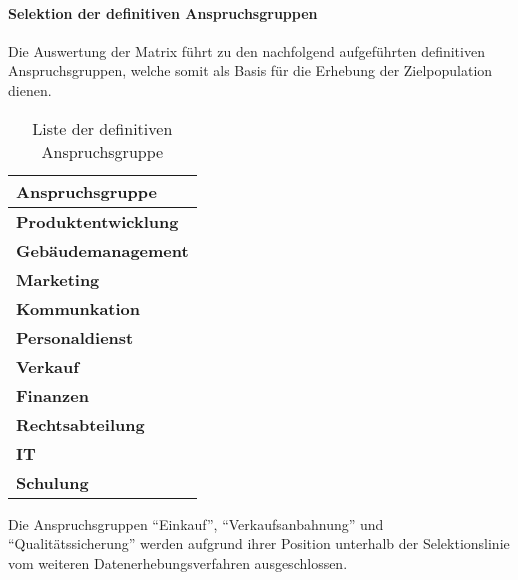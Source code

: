 \documentclass[../../main.tex]{subfiles}
\begin{document}

\paragraph*{Selektion der definitiven Anspruchsgruppen}\mbox{}

\begin{sloppypar}
Die Auswertung der Matrix führt zu den nachfolgend aufgeführten definitiven Anspruchsgruppen, welche somit als Basis für die Erhebung der Zielpopulation dienen.
\end{sloppypar}


\begin{table}[H]
\tablefontsize	
\caption{Liste der definitiven Anspruchsgruppe}
\label{definitive_anspruchsgruppen}


\begin{tabular}{ |p{8cm}| }


\hline
\tableheaderbgcolor
\textbf{Anspruchsgruppe} \\ 
\hline


\textbf{Produktentwicklung}             \\ \hline
\textbf{Gebäudemanagement}              \\ \hline
\textbf{Marketing}                      \\ \hline
\textbf{Kommunkation}                   \\ \hline
\textbf{Personaldienst}                 \\ \hline
\textbf{Verkauf}                        \\ \hline
\textbf{Finanzen}                       \\ \hline
\textbf{Rechtsabteilung}                \\ \hline
\textbf{IT}                             \\ \hline
\textbf{Schulung}                       \\ \hline

\end{tabular}
\end{table}

\begin{sloppypar}
Die Anspruchsgruppen "`Einkauf"', "`Verkaufsanbahnung"' und "`Qualitätssicherung"' werden aufgrund ihrer Position unterhalb der Selektionslinie vom weiteren Datenerhebungsverfahren ausgeschlossen.
\end{sloppypar}
\end{document}
